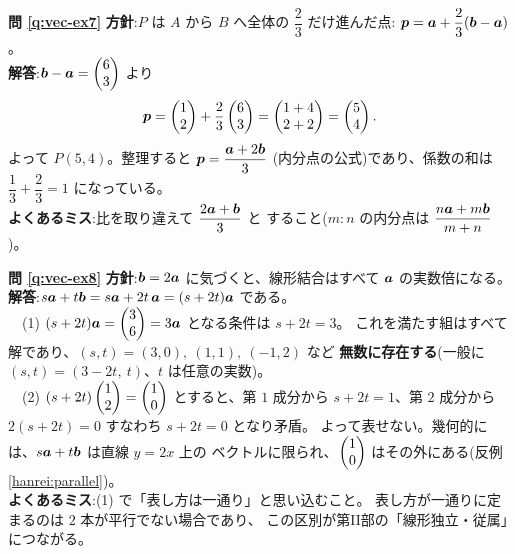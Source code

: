 \bigskip
\noindent\textbf{問 \ref{q:vec-ex7}}\quad
\textbf{方針}:$P$ は $A$ から $B$ へ全体の $\dfrac{2}{3}$ だけ進んだ点:
$\bm{p} = \bm{a} + \dfrac{2}{3}(\bm{b} - \bm{a})$。\\
\textbf{解答}:$\bm{b} - \bm{a} = \begin{pmatrix}6 \\ 3\end{pmatrix}$ より
\[
\bm{p} = \begin{pmatrix}1 \\ 2\end{pmatrix} + \frac{2}{3}\begin{pmatrix}6 \\ 3\end{pmatrix}
= \begin{pmatrix}1 + 4 \\ 2 + 2\end{pmatrix} = \begin{pmatrix}5 \\ 4\end{pmatrix}.
\]
よって $P(5, 4)$。整理すると $\bm{p} = \dfrac{\bm{a} + 2\bm{b}}{3}$
(内分点の公式)であり、係数の和は $\dfrac{1}{3} + \dfrac{2}{3} = 1$ になっている。\\
\textbf{よくあるミス}:比を取り違えて $\dfrac{2\bm{a} + \bm{b}}{3}$ と
すること($m : n$ の内分点は $\dfrac{n\bm{a} + m\bm{b}}{m + n}$)。

\bigskip
\noindent\textbf{問 \ref{q:vec-ex8}}\quad
\textbf{方針}:$\bm{b} = 2\bm{a}$ に気づくと、線形結合はすべて
$\bm{a}$ の実数倍になる。\\
\textbf{解答}:$s\bm{a} + t\bm{b} = s\bm{a} + 2t\,\bm{a} = (s + 2t)\bm{a}$
である。\\
　(1) $(s + 2t)\bm{a} = \begin{pmatrix}3 \\ 6\end{pmatrix} = 3\bm{a}$ となる条件は $s + 2t = 3$。
これを満たす組はすべて解であり、$(s, t) = (3, 0),\ (1, 1),\ (-1, 2)$ など
\textbf{無数に存在する}(一般に $(s, t) = (3 - 2t,\ t)$、$t$ は任意の実数)。\\
　(2) $(s + 2t)\begin{pmatrix}1 \\ 2\end{pmatrix} = \begin{pmatrix}1 \\ 0\end{pmatrix}$ とすると、第 $1$ 成分から
$s + 2t = 1$、第 $2$ 成分から $2(s + 2t) = 0$ すなわち $s + 2t = 0$ となり矛盾。
よって表せない。幾何的には、$s\bm{a} + t\bm{b}$ は直線 $y = 2x$ 上の
ベクトルに限られ、$\begin{pmatrix}1 \\ 0\end{pmatrix}$ はその外にある(反例 \ref{hanrei:parallel})。\\
\textbf{よくあるミス}:(1) で「表し方は一通り」と思い込むこと。
表し方が一通りに定まるのは $2$ 本が平行でない場合であり、
この区別が第II部の「線形独立・従属」につながる。

